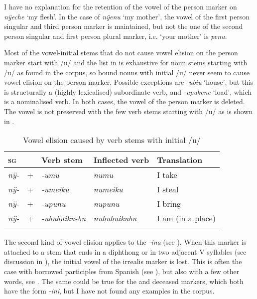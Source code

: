I have no explanation for the retention of the vowel of the person marker on \textit{nÿeche} ‘my flesh’. In the case of \textit{nÿenu} ‘my mother’, the vowel of the first person singular and third person marker is maintained, but not the one of the second person singular and first person plural marker, i.e. ‘your mother’ is \textit{penu}.

Most of the vowel-initial stems that do not cause vowel elision on the person marker start with /u/ and the list in  is exhaustive for noun stems starting with /u/ as found in the corpus, so bound nouns with initial /u/ never seem to cause vowel elision on the person marker. Possible exceptions are \mbox{\textit{-ubiu}} ‘house’, but this is structurally a (highly lexicalised) subordinate verb, and \textit{-upukene} ‘load’, which is a nominalised verb. In both cases, the vowel of the person marker is deleted. The vowel is not preserved with the few verb stems starting with /u/ as is shown in .

\begin{table}
\caption{Vowel elision caused by verb stems with initial /u/}

\begin{tabular}{lllll}
\lsptoprule
1\textsc{sg} & & Verb stem & Inflected verb & Translation\\
\midrule
	\textit{nÿ-}  & + & \textit{-umu} &  \textit{numu} & I take\\
	\textit{nÿ-} & + & \textit{-umeiku} &  \textit{numeiku} & I steal \\
	\textit{nÿ-} & + & \textit{-upunu} &  \textit{nupunu} & I bring \\
	\textit{nÿ-} & + & \textit{-ububuiku-bu} & \textit{nububuikubu} & I am (in a place)\\
\lspbottomrule
\end{tabular}

\label{table:elision2}
\end{table}


The second kind of vowel elision applies to the  \textit{-ina} (see ). When this marker is attached to a stem that ends in a diphthong or in two adjacent V syllables (see discussion in ), the initial vowel of the irrealis marker is lost. This is often the case with borrowed participles from Spanish (see ), but also with a few other words, see . The same could be true for the  and deceased markers, which both have the form \textit{-ini}, but I have not found any examples in the corpus.

